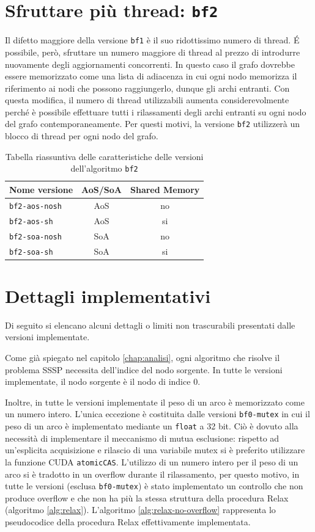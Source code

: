 \documentclass[12pt,a4paper,oneside]{book}
\begin{document}
	\section{Sfruttare più thread: \texttt{bf2}}
	Il difetto maggiore della versione \texttt{bf1} è il suo ridottissimo numero di thread. \'E possibile, però, sfruttare un numero maggiore di thread al prezzo di introdurre nuovamente degli aggiornamenti concorrenti. In questo caso il grafo dovrebbe essere memorizzato come una lista di adiacenza in cui ogni nodo memorizza il riferimento ai nodi che possono raggiungerlo, dunque gli archi entranti. Con questa modifica, il numero di thread utilizzabili aumenta considerevolmente perché è possibile effettuare tutti i rilassamenti degli archi entranti su ogni nodo del grafo contemporaneamente. Per questi motivi, la versione \texttt{bf2} utilizzerà un blocco di thread per ogni nodo del grafo.

	\begin{table}[!ht]
		\centering
		\begin{tabular}{|l|c|c|}
			\hline
			\textbf{Nome versione} & \textbf{AoS/SoA} & \textbf{Shared Memory} \\ \hline
			\texttt{bf2-aos-nosh}  & AoS & no \\ \hline
			\texttt{bf2-aos-sh}    & AoS & si \\ \hline
			\texttt{bf2-soa-nosh}  & SoA & no \\ \hline
			\texttt{bf2-soa-sh}    & SoA & si \\ \hline
		\end{tabular}
		\label{tab:riassunto_bf2}
		\caption{Tabella riassuntiva delle caratteristiche delle versioni dell'algoritmo \texttt{bf2}}
	\end{table}
	
	\section{Dettagli implementativi}
	\label{section:impl}
	Di seguito si elencano alcuni dettagli o limiti non trascurabili presentati dalle versioni implementate.
	
	Come già spiegato nel capitolo \ref{chap:analisi}, ogni algoritmo che risolve il problema SSSP necessita dell'indice del nodo sorgente. In tutte le versioni implementate, il nodo sorgente è il nodo di indice $0$.
	
	Inoltre, in tutte le versioni implementate il peso di un arco è memorizzato come un numero intero. L'unica eccezione è costituita dalle versioni \texttt{bf0-mutex} in cui il peso di un arco è implementato mediante un \texttt{float} a 32 bit. Ciò è dovuto alla necessità di implementare il meccanismo di mutua esclusione: rispetto ad un'esplicita acquisizione e rilascio di una variabile mutex si è preferito utilizzare la funzione CUDA \texttt{atomicCAS}. L'utilizzo di un numero intero per il peso di un arco si è tradotto in un overflow durante il rilassamento, per questo motivo, in tutte le versioni (esclusa \texttt{bf0-mutex}) è stato implementato un controllo che non produce overflow e che non ha più la stessa struttura della procedura Relax (algoritmo \ref{alg:relax}). L'algoritmo \ref{alg:relax-no-overflow} rappresenta lo pseudocodice della procedura Relax effettivamente implementata.
	
\end{document}
